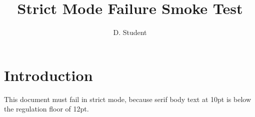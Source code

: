 \documentclass[phd,font=termes,10pt,a4paper]{bangorthesis}
\title{Strict Mode Failure Smoke Test}
\author{D. Student}
\begin{document}
\maketitle
\chapter{Introduction}
This document must fail in strict mode, because serif body text at
10pt is below the regulation floor of 12pt.
\end{document}
